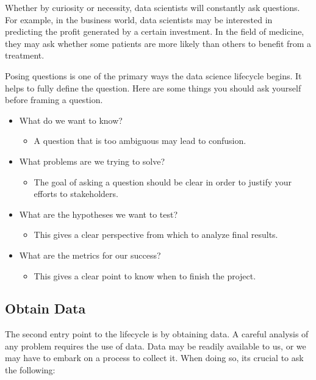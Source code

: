 \documentclass[
  letterpaper,
  DIV=11,
  numbers=noendperiod]{scrreprt}
\providecommand{\tightlist}{%
  \setlength{\itemsep}{0pt}\setlength{\parskip}{0pt}}\usepackage{longtable,booktabs,array}
\begin{document}
Whether by curiosity or necessity, data scientists will constantly ask
questions. For example, in the business world, data scientists may be
interested in predicting the profit generated by a certain investment.
In the field of medicine, they may ask whether some patients are more
likely than others to benefit from a treatment.

Posing questions is one of the primary ways the data science lifecycle
begins. It helps to fully define the question. Here are some things you
should ask yourself before framing a question.

\begin{itemize}
\tightlist
\item
  What do we want to know?

  \begin{itemize}
  \tightlist
  \item
    A question that is too ambiguous may lead to confusion.
  \end{itemize}
\item
  What problems are we trying to solve?

  \begin{itemize}
  \tightlist
  \item
    The goal of asking a question should be clear in order to justify
    your efforts to stakeholders.
  \end{itemize}
\item
  What are the hypotheses we want to test?

  \begin{itemize}
  \tightlist
  \item
    This gives a clear perspective from which to analyze final results.
  \end{itemize}
\item
  What are the metrics for our success?

  \begin{itemize}
  \tightlist
  \item
    This gives a clear point to know when to finish the project.
  \end{itemize}
\end{itemize}

\hypertarget{obtain-data}{%
\subsection{Obtain Data}\label{obtain-data}}

The second entry point to the lifecycle is by obtaining data. A careful
analysis of any problem requires the use of data. Data may be readily
available to us, or we may have to embark on a process to collect it.
When doing so, its crucial to ask the following:
\end{document}
